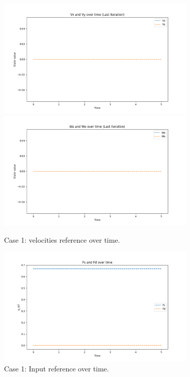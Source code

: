 \begin{figure}[H]
  \centering
  \includegraphics[width=0.85\textwidth]{pictures/Figure_3_posizione_smooth}\hfill \\
  \includegraphics[width=0.85\textwidth]{pictures/Figure_4_posizione_smooth}\hfill
  \caption{Case 1: velocities reference over time.}
  \label{fig:Reference trajectory}
  \includegraphics[width=0.85\textwidth]{pictures/Figure_5_posizione_smooth}
  \caption{Case 1: Input reference over time.}
  \label{fig:Reference trajectory}
\end{figure}

